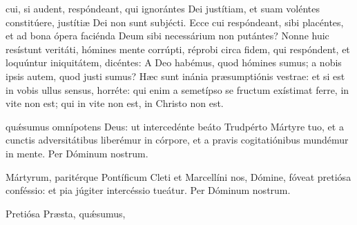 \documentclass[fontsize=9pt,paper=A6,twoside,BCOR=1mm,DIV=22,headinclude]{scrarticle}
\begin{document}
\begin{multicols}{2}
\RVMTPviii 

{

 cui, si audent, respóndeant, qui ignorántes Dei justítiam, et suam voléntes constitúere, justítiæ Dei non sunt subjécti. Ecce cui respóndeant, sibi placéntes, et ad bona ópera faciénda Deum sibi necessárium non putántes? Nonne huic resístunt veritáti, hómines mente corrúpti, réprobi circa fidem, qui respóndent, et loquúntur iniquitátem, dicéntes: A Deo habémus, quod hómines sumus; a nobis ipsis autem, quod justi sumus? Hæc sunt inánia præsumptiónis vestrae: et si est in vobis ullus sensus, horréte: qui enim a semetípso se fructum exístimat ferre, in vite non est; qui in vite non est, in Christo non est.

\Te 


\VRMTPii 

\BMTP

 qu\'æsumus omnípotens Deus: ut intercedénte beáto Trudpérto Mártyre tuo, et a cunctis adversitátibus liberémur in córpore, et a pravis cogitatiónibus mundémur in mente. Per Dóminum nostrum.


\AiMTP 

\VRMTPi 

 Mártyrum, paritérque Pontíficum Cleti et Marcellíni nos, Dómine, fóveat pretiósa conféssio: et pia júgiter intercéssio tueátur. Per Dóminum nostrum.


}






\AiiiMTP 

\V Pretiósa  Præsta, qu\'æsumus, 



\end{multicols}
\end{document}
